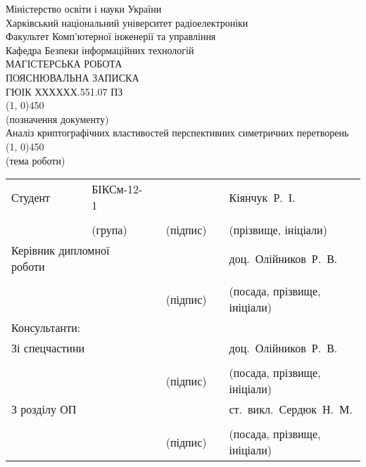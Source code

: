 
\thispagestyle{empty}
\begin{center}
    Міністерство освіти і науки України \\[1ex]
    Харківський національний університет радіоелектроніки \\[1ex]
    Факультет Комп'ютерної інженерії та управління \\[1ex]
    Кафедра Безпеки інформаційних технологій \\[2ex]
    \MakeUppercase{Магістерська робота} \\[4ex]
    \MakeUppercase{Пояснювальна записка} \\[1ex]

    \MakeUppercase{ГЮІК ХХХХХХ.551.07 ПЗ} \\[-2ex]
    \line(1, 0){450} \\[-2ex]
    {\scriptsize (позначення документу)} \\[2ex]

    Аналіз криптографічних властивостей перспективних симетричних перетворень \\[-2ex]
    \line(1, 0){450} \\[-2ex]
    {\scriptsize (тема роботи)} \\[2ex]

    \begin{tabular}{
        p{}
        >{\centering\arraybackslash}p{}
        >{\centering\arraybackslash}p{}
        >{\centering\arraybackslash}p{}
        >{\centering\arraybackslash}p{}
        >{\centering\arraybackslash}p{}}
        Студент & БІКСм-12-1 & & & & Кіянчук~Р.~І. \\ \cline{2-2}\cline{4-4}\cline{6-6} \\[-4ex]
        & {\scriptsize (група)} & & {\scriptsize (підпис)} & & {\scriptsize (прізвище, ініціали)} \\[1ex]
        \multicolumn{2}{p{0.4\textwidth}}{Керівник дипломної роботи} & & & & доц.~Олійников~Р.~В. \\ \cline{4-4}\cline{6-6} \\[-4ex]
        & & & {\scriptsize (підпис)} & & {\scriptsize (посада, прізвище, ініціали)} \\
        Консультанти: & & & & & \\[1ex]
        \multicolumn{2}{p{0.4\textwidth}}{Зі спецчастини} & & & & доц.~Олійников~Р.~В. \\ \cline{4-4}\cline{6-6} \\[-4ex]
        & & & {\scriptsize (підпис)} & & {\scriptsize (посада, прізвище, ініціали)} \\[1ex]
        \multicolumn{2}{p{0.4\textwidth}}{З розділу ОП} & & & & ст.~викл.~Сердюк~Н.~М. \\ \cline{4-4}\cline{6-6} \\[-4ex]
        & & & {\scriptsize (підпис)} & & {\scriptsize (посада, прізвище, ініціали)} \\[1ex]
        \end{tabular}


\end{center}
